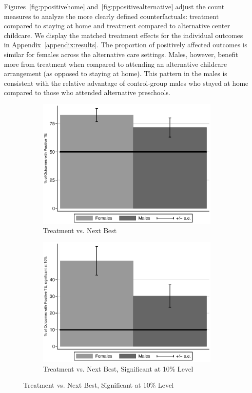 Figures~\ref{fig:ppositivehome} and~\ref{fig:ppositivealternative} adjust the count measures to analyze the more clearly defined counterfactuals: treatment compared to staying at home and treatment compared to alternative center childcare. We display the matched treatment effects for the individual outcomes in Appendix~\ref{appendix:results}. The proportion of positively affected outcomes is similar for females across the alternative care settings. Males, however, benefit more from treatment when compared to attending an alternative childcare arrangement (as opposed to staying at home). This pattern in the males is consistent with the relative advantage of control-group males who stayed at home compared to those who attended alternative preschools. 




\begin{figure}
\centering
\caption{Positively Impacted Outcomes, ABC/CARE Males and Females}\label{fig:ppositive}
\begin{subfigure}[h]{0.4\textwidth}
		\centering
		\caption{Treatment vs. Next Best} \label{fig:ppositivenb}
		\includegraphics[width=\textwidth]{output/itt_noctrl_all.eps}
\end{subfigure}%
\begin{subfigure}[h]{0.4\textwidth}
	\centering
	\caption{Treatment vs. Next Best, Significant at 10\% Level} \label{fig:ppositive10}
		\includegraphics[width=\textwidth]{output/itt_noctrl_all_sig10.eps}

\end{subfigure}
\end{figure}
